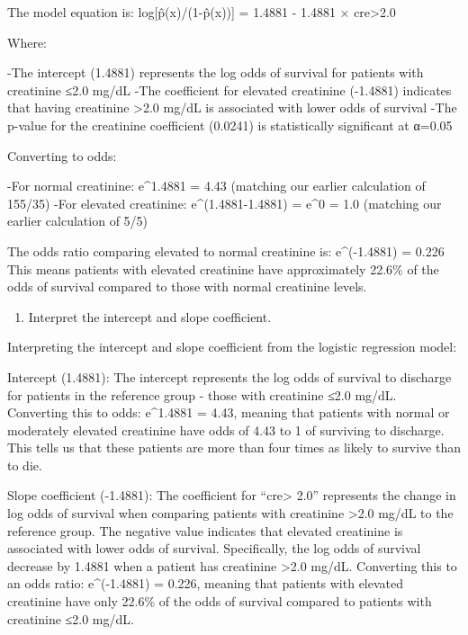 \documentclass[
]{article}
\providecommand{\tightlist}{%
  \setlength{\itemsep}{0pt}\setlength{\parskip}{0pt}}
\begin{document}
The model equation is: log{[}p̂(x)/(1-p̂(x)){]} = 1.4881 - 1.4881 ×
cre\textgreater2.0

Where:

-The intercept (1.4881) represents the log odds of survival for patients
with creatinine ≤2.0 mg/dL -The coefficient for elevated creatinine
(-1.4881) indicates that having creatinine \textgreater2.0 mg/dL is
associated with lower odds of survival -The p-value for the creatinine
coefficient (0.0241) is statistically significant at α=0.05

Converting to odds:

-For normal creatinine: e\^{}1.4881 = 4.43 (matching our earlier
calculation of 155/35) -For elevated creatinine: e\^{}(1.4881-1.4881) =
e\^{}0 = 1.0 (matching our earlier calculation of 5/5)

The odds ratio comparing elevated to normal creatinine is:
e\^{}(-1.4881) = 0.226 This means patients with elevated creatinine have
approximately 22.6\% of the odds of survival compared to those with
normal creatinine levels.

\begin{enumerate}
\def\labelenumi{\alph{enumi})}
\setcounter{enumi}{1}
\tightlist
\item
  Interpret the intercept and slope coefficient.
\end{enumerate}

Interpreting the intercept and slope coefficient from the logistic
regression model:

Intercept (1.4881): The intercept represents the log odds of survival to
discharge for patients in the reference group - those with creatinine
≤2.0 mg/dL. Converting this to odds: e\^{}1.4881 = 4.43, meaning that
patients with normal or moderately elevated creatinine have odds of 4.43
to 1 of surviving to discharge. This tells us that these patients are
more than four times as likely to survive than to die.

Slope coefficient (-1.4881): The coefficient for ``cre\textgreater{}
2.0'' represents the change in log odds of survival when comparing
patients with creatinine \textgreater2.0 mg/dL to the reference group.
The negative value indicates that elevated creatinine is associated with
lower odds of survival. Specifically, the log odds of survival decrease
by 1.4881 when a patient has creatinine \textgreater2.0 mg/dL.
Converting this to an odds ratio: e\^{}(-1.4881) = 0.226, meaning that
patients with elevated creatinine have only 22.6\% of the odds of
survival compared to patients with creatinine ≤2.0 mg/dL.
\end{document}
